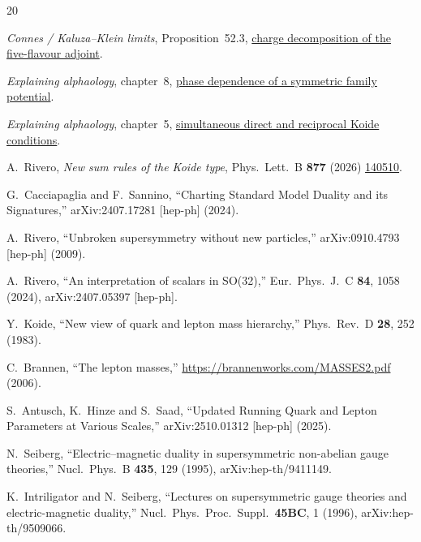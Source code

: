 \documentclass[11pt,a4paper]{article}
\begin{document}
\begin{thebibliography}{20}

  \emph{Connes / Kaluza--Klein limits}, Proposition~52.3,
  \href{https://github.com/arivero/conneskk/blob/fd698239cd54a4b8a25054cab7abb4c408f96883/lemmas/52_lepton_generation_three_views.md}{charge decomposition of the five-flavour adjoint}.

  \emph{Explaining alphaology}, chapter~8,
  \href{https://github.com/arivero/dualsm/blob/master/sources/alphaology-geometry-duality.md}{phase dependence of a symmetric family potential}.

  \emph{Explaining alphaology}, chapter~5,
  \href{https://github.com/arivero/dualsm/blob/master/sources/alphaology-shape.md}{simultaneous direct and reciprocal Koide conditions}.

  A.~Rivero, \emph{New sum rules of the Koide type},
  Phys.\ Lett.\ B \textbf{877} (2026)
  \href{https://doi.org/10.1016/j.physletb.2026.140510}{140510}.

G.~Cacciapaglia and F.~Sannino,
``Charting Standard Model Duality and its Signatures,''
arXiv:2407.17281 [hep-ph] (2024).

A.~Rivero,
``Unbroken supersymmetry without new particles,''
arXiv:0910.4793 [hep-ph] (2009).

A.~Rivero,
``An interpretation of scalars in SO(32),''
Eur.\ Phys.\ J.\ C \textbf{84}, 1058 (2024),
arXiv:2407.05397 [hep-ph].

Y.~Koide,
``New view of quark and lepton mass hierarchy,''
Phys.\ Rev.\ D \textbf{28}, 252 (1983).

C.~Brannen,
``The lepton masses,''
\url{https://brannenworks.com/MASSES2.pdf} (2006).

S.~Antusch, K.~Hinze and S.~Saad,
``Updated Running Quark and Lepton Parameters at Various Scales,''
arXiv:2510.01312 [hep-ph] (2025).

N.~Seiberg,
``Electric--magnetic duality in supersymmetric non-abelian gauge
theories,''
Nucl.\ Phys.\ B \textbf{435}, 129 (1995),
arXiv:hep-th/9411149.

K.~Intriligator and N.~Seiberg,
``Lectures on supersymmetric gauge theories and electric-magnetic
duality,''
Nucl.\ Phys.\ Proc.\ Suppl.\ \textbf{45BC}, 1 (1996),
arXiv:hep-th/9509066.


\end{thebibliography}
\end{document}
